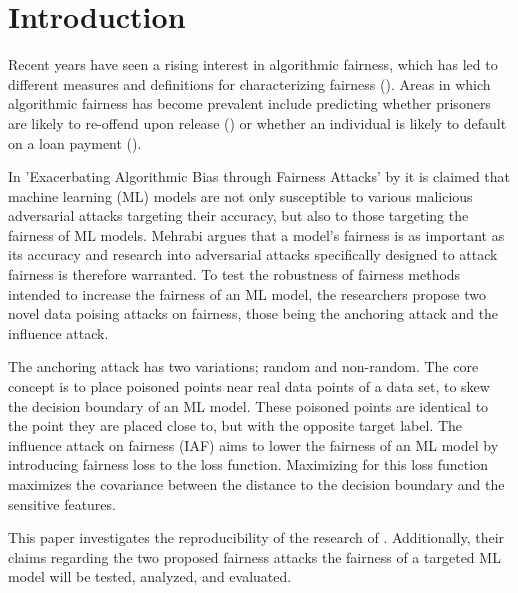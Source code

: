 \section{Introduction}
\label{intro}

Recent years have seen a rising interest in algorithmic fairness, which has led to different measures and definitions for characterizing fairness (\cite{dwork2012fairness, hardt2016equality, kusner2017counterfactual, verma2018, mehrabi2019survey}). Areas in which algorithmic fairness has become prevalent include predicting whether prisoners are likely to re-offend upon release (\cite{duwe2017}) or whether an individual is likely to default on a loan payment (\cite{ereiz2019}).

In 'Exacerbating Algorithmic Bias through Fairness Attacks' by \cite{mehrabi2020exacerbating} it is claimed that machine learning (ML) models are not only susceptible to various malicious adversarial attacks targeting their accuracy, but also to those targeting the fairness of ML models.
Mehrabi argues that a model's fairness is as important as its accuracy and research into adversarial attacks specifically designed to attack fairness is therefore warranted. To test the robustness of fairness methods intended to increase the fairness of an ML model, the researchers propose two novel data poising attacks on fairness, those being the anchoring attack and the influence attack.

The anchoring attack has two variations; random and non-random. The core concept is to place poisoned points near real data points of a data set, to skew the decision boundary of an ML model. These poisoned points are identical to the point they are placed close to, but with the opposite target label. 
The influence attack on fairness (IAF) aims to lower the fairness of an ML model by introducing fairness loss to the loss function. Maximizing for this loss function maximizes the covariance between the distance to the decision boundary and the sensitive features.

This paper investigates the reproducibility of the research of \cite{mehrabi2020exacerbating}. Additionally, their claims regarding the two proposed fairness attacks the fairness of a targeted ML model will be tested, analyzed, and evaluated.


